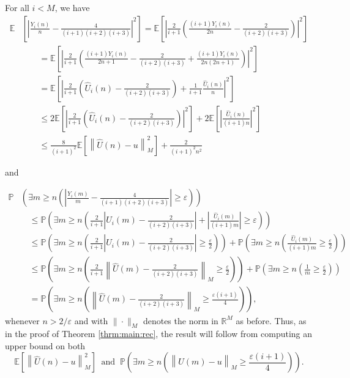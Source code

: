 \documentclass[12pt]{amsart}
\theoremstyle{definition}
\theoremstyle{remark}
\newcommand{\RR}{\mathbb{R}}
\newcommand{\PP}{\mathbb{P}}
\newcommand{\EE}{\mathbb{E}}
\newcommand{\eps}{\varepsilon}
\begin{document}
For all $i<M$, we have
\begin{align*}
    \EE&\left[ \left| \frac{Y_i(n)}{n} - \frac{4}{(i+1)(i+2)(i+3)} \right|^2 \right]= \EE\left[ \left| \frac{2}{i+1}\left( \frac{(i+1)Y_i(n)}{2n} - \frac{2}{(i+2)(i+3)} \right) \right|^2 \right]\\
    &\qquad = \EE\left[ \left| \frac{2}{i+1}\left( \frac{(i+1)Y_i(n)}{2n+1} - \frac{2}{(i+2)(i+3)} + \frac{(i+1)Y_i(n)}{2n(2n+1)} \right) \right|^2 \right]\\
    &\qquad = \EE\left[ \left| \frac{2}{i+1}\left( \hat{U}_i(n) - \frac{2}{(i+2)(i+3)} \right) + \frac{1}{i+1}\frac{\hat{U}_i(n)}{n} \right|^2 \right]\\
    &\qquad \leq 2\EE\left[ \left| \frac{2}{i+1}\left( \hat{U}_i(n) - \frac{2}{(i+2)(i+3)}\right) \right|^2 \right] + 2\EE\left[ \left| \frac{\hat{U}_i(n)}{(i+1)n} \right|^2 \right]\\
    &\qquad \leq\frac{8}{(i+1)^2}\EE\left[ \left\| \hat{U}(n) - u \right\|_M^2 \right] + \frac{2}{(i+1)^2n^2}
\end{align*}

and

\begin{align*}
    \PP&\left( \exists m\geq  n \left( \left|\frac{Y_i(m)}{m} - \frac{4}{(i+1)(i+2)(i+3)}\right|\geq \eps \right) \right)\\
    &\quad \leq \PP \left( \exists m\geq n \left( \frac{2}{i+1}\left| \hat{U}_i(m)-\frac{2}{(i+2)(i+3)}\right| + \left|\frac{\hat{U}_i(m)}{(i+1)m}\right|\geq \eps \right) \right)\\
    &\quad \leq \PP \left( \exists m\geq n \left( \frac{2}{i+1}\left| \hat{U}_i(m)-\frac{2}{(i+2)(i+3)}\right|\geq \frac{\eps}{2}\right)\right) + \PP\left( \exists m\geq n \left( \frac{\hat{U}_i(m)}{(i+1)m}\geq \frac{\eps}{2} \right) \right)\\
    &\quad \leq \PP \left( \exists m\geq n \left( \frac{2}{i+1}\left\| \hat{U}(m)-\frac{2}{(i+2)(i+3)}\right\|_M\geq \frac{\eps}{2}\right)\right) + \PP\left( \exists m\geq n \left( \frac{1}{m}\geq \frac{\eps}{2} \right) \right)\\
    &\quad = \PP \left( \exists m\geq n \left( \left\| \hat{U}(m)-\frac{2}{(i+2)(i+3)}\right\|_M\geq \frac{\eps(i+1)}{4}\right) \right),
\end{align*}
whenever $n>2/\eps$ and with $\|\cdot\|_M$ denotes the norm in $\RR^M$ as before. Thus, as in the proof of Theorem \ref{thrm:main:rec}, the result will follow from computing an upper bound on both
\[
\EE\left[ \left\| \hat{U}(n) - u \right\|_M^2 \right]\ \text{ and }\ \PP \left( \exists m\geq n \left( \left\| \hat{U}(m)-u\right\|_M\geq \frac{\eps(i+1)}{4}\right) \right).
\]
\end{document}
